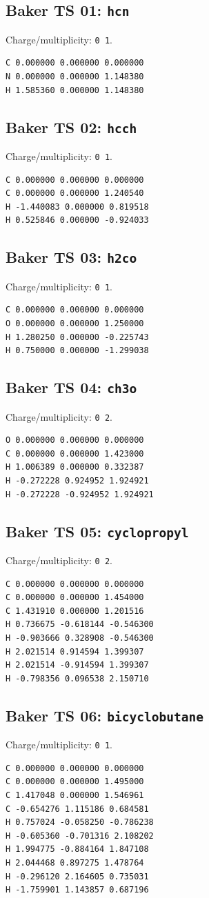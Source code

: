 \documentclass[10pt]{article}
\begin{document}
{\subsection*{Baker TS 01: \texttt{hcn}}
Charge/multiplicity: \texttt{0 1}.
\begin{verbatim}
C 0.000000 0.000000 0.000000
N 0.000000 0.000000 1.148380
H 1.585360 0.000000 1.148380
\end{verbatim}
\subsection*{Baker TS 02: \texttt{hcch}}
Charge/multiplicity: \texttt{0 1}.
\begin{verbatim}
C 0.000000 0.000000 0.000000
C 0.000000 0.000000 1.240540
H -1.440083 0.000000 0.819518
H 0.525846 0.000000 -0.924033
\end{verbatim}
\subsection*{Baker TS 03: \texttt{h2co}}
Charge/multiplicity: \texttt{0 1}.
\begin{verbatim}
C 0.000000 0.000000 0.000000
O 0.000000 0.000000 1.250000
H 1.280250 0.000000 -0.225743
H 0.750000 0.000000 -1.299038
\end{verbatim}
\subsection*{Baker TS 04: \texttt{ch3o}}
Charge/multiplicity: \texttt{0 2}.
\begin{verbatim}
O 0.000000 0.000000 0.000000
C 0.000000 0.000000 1.423000
H 1.006389 0.000000 0.332387
H -0.272228 0.924952 1.924921
H -0.272228 -0.924952 1.924921
\end{verbatim}
\subsection*{Baker TS 05: \texttt{cyclopropyl}}
Charge/multiplicity: \texttt{0 2}.
\begin{verbatim}
C 0.000000 0.000000 0.000000
C 0.000000 0.000000 1.454000
C 1.431910 0.000000 1.201516
H 0.736675 -0.618144 -0.546300
H -0.903666 0.328908 -0.546300
H 2.021514 0.914594 1.399307
H 2.021514 -0.914594 1.399307
H -0.798356 0.096538 2.150710
\end{verbatim}
\subsection*{Baker TS 06: \texttt{bicyclobutane}}
Charge/multiplicity: \texttt{0 1}.
\begin{verbatim}
C 0.000000 0.000000 0.000000
C 0.000000 0.000000 1.495000
C 1.417048 0.000000 1.546961
C -0.654276 1.115186 0.684581
H 0.757024 -0.058250 -0.786238
H -0.605360 -0.701316 2.108202
H 1.994775 -0.884164 1.847108
H 2.044468 0.897275 1.478764
H -0.296120 2.164605 0.735031
H -1.759901 1.143857 0.687196
\end{verbatim}
}
\end{document}
